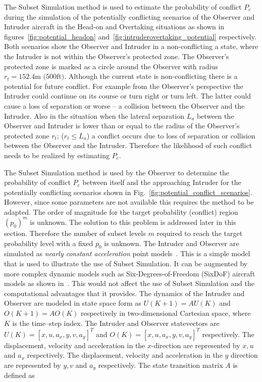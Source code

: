 \documentclass[journal]{IEEEtran}
\begin{document}
The Subset Simulation method is used to estimate the probability of conflict $P_{c}$ during the simulation of the potentially conflicting scenarios of the Observer and Intruder aircraft in the Head-on and Overtaking situations as shown in figures~\ref{fig:potential_headon} and~\ref{fig:intruderovertaking_potential} respectively. Both scenarios show the Observer and Intruder in a non-conflicting a state, where the Intruder is not within the Observer's protected zone. The Observer's protected zone is marked as a circle around the Observer with radius $r_{t} = 152.4 \text{m } \text{(500ft)}$. Although the current state is non-conflicting there is a potential for future conflict. For example from the Observer's perspective the Intruder could continue on its course or turn right or turn left. The latter could cause a loss of separation or worse -- a collision between the Observer and the Intruder. Also in the situation when the lateral separation $L_{a}$ between the Observer and Intruder is lower than or equal to the radius of the Observer's protected zone $r_{t}$; ($r_{t} \leq L_{a}$) a conflict occurs due to loss of separation or collision between the Observer and the Intruder. Therefore the likelihood of such conflict needs to be realized by estimating $P_{c}$.

The Subset Simulation method is used by the Observer to determine the probability of conflict $P_{c}$ between itself and the approaching Intruder for the potentially conflicting scenarios shown in Fig.~\ref{fig:potential_conflict_scenarios}. However, since some parameters are not available this requires the method to be adapted. The order of magnitude for the target probability (conflict) region $(p_{0})^{m}$ is unknown. The solution to this problem is addressed later in this section. Therefore the number of subset levels $m$ required to reach the target probability level with a fixed $p_{0}$ is unknown. The Intruder and Observer are simulated as \textit{nearly constant acceleration} point models~\cite{RongLi2003}. This is a simple model that is used to illustrate the use of Subset Simulation. It can be augmented by more complex dynamic models such as Six-Degrees-of-Freedom (SixDoF) aircraft models as shown in~\cite{nelson1998flight}. This would not affect the use of Subset Simulation and the computational advantages that it provides. The dynamics of the Intruder and Observer are modeled in state space form as $U(K+1) = AU(K)$ and $O(K+1) = AO(K)$ respectively in two-dimensional Cartesian space, where $K$ is the time--step index. The Intruder and Observer statevectors are $U(K) = [x, u, a_{x}, y, v, a_{y}]^{T}$ and $O(K) = [x, u, a_{x}, y, v, a_{y}]^{T}$ respectively. The displacement, velocity and acceleration in the $x$-direction are represented by $x, u$ and $a_{x}$ respectively. The displacement, velocity and acceleration in the $y$ direction are represented by $y, v$ and $a_{y}$ respectively. The state transition matrix $A$ is defined as
\end{document}
